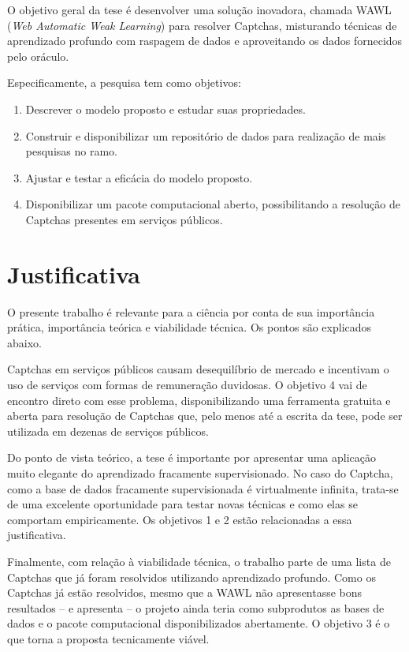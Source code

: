 \documentclass[12pt,twoside,brazilian]{book}
\providecommand{\tightlist}{%
  \setlength{\itemsep}{0pt}\setlength{\parskip}{0pt}}
\begin{document}
O objetivo geral da tese é desenvolver uma solução inovadora, chamada
WAWL (\emph{Web Automatic Weak Learning}) para resolver Captchas,
misturando técnicas de aprendizado profundo com raspagem de dados e
aproveitando os dados fornecidos pelo oráculo.

Especificamente, a pesquisa tem como objetivos:

\begin{enumerate}
\def\labelenumi{\arabic{enumi}.}
\tightlist
\item
  Descrever o modelo proposto e estudar suas propriedades.
\item
  Construir e disponibilizar um repositório de dados para realização de
  mais pesquisas no ramo.
\item
  Ajustar e testar a eficácia do modelo proposto.
\item
  Disponibilizar um pacote computacional aberto, possibilitando a
  resolução de Captchas presentes em serviços públicos.
\end{enumerate}

\hypertarget{sec-justificativa}{%
\section{Justificativa}\label{sec-justificativa}}

O presente trabalho é relevante para a ciência por conta de sua
importância prática, importância teórica e viabilidade técnica. Os
pontos são explicados abaixo.

Captchas em serviços públicos causam desequilíbrio de mercado e
incentivam o uso de serviços com formas de remuneração duvidosas. O
objetivo 4 vai de encontro direto com esse problema, disponibilizando
uma ferramenta gratuita e aberta para resolução de Captchas que, pelo
menos até a escrita da tese, pode ser utilizada em dezenas de serviços
públicos.

Do ponto de vista teórico, a tese é importante por apresentar uma
aplicação muito elegante do aprendizado fracamente supervisionado. No
caso do Captcha, como a base de dados fracamente supervisionada é
virtualmente infinita, trata-se de uma excelente oportunidade para
testar novas técnicas e como elas se comportam empiricamente. Os
objetivos 1 e 2 estão relacionadas a essa justificativa.

Finalmente, com relação à viabilidade técnica, o trabalho parte de uma
lista de Captchas que já foram resolvidos utilizando aprendizado
profundo. Como os Captchas já estão resolvidos, mesmo que a WAWL não
apresentasse bons resultados -- e apresenta -- o projeto ainda teria
como subprodutos as bases de dados e o pacote computacional
disponibilizados abertamente. O objetivo 3 é o que torna a proposta
tecnicamente viável.
\end{document}
